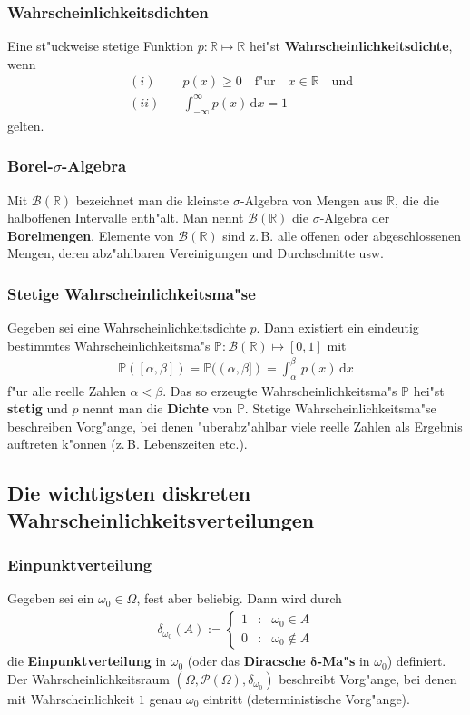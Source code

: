 \documentclass[ngerman,draft,parskip=half,twoside]{scrartcl}
\newcommand*{\R}{\mathbb{R}}      %
\newcommand*{\BorelM}{\mathcal{B}}  %
\newcommand*{\PotM}{\mathcal{P}}    %
\newcommand*{\WKM}{\mathbb{P}}      %
\begin{document}
\subsubsection{Wahrscheinlichkeitsdichten}
Eine st"uckweise stetige Funktion $p\colon\R\mapsto\R$ hei"st
\textbf{Wahrscheinlichkeitsdichte}, wenn
\begin{eqnarray*}
&(i)&\quad p(x)\ge 0\quad\mbox{f"ur}\quad x\in\R\quad \mbox{und}\\
&(ii)&\quad\int_{-\infty}^\infty p(x)\,\mathrm d x=1
\end{eqnarray*}
gelten.
\subsubsection{Borel-$\sigma$-Algebra}
Mit $\BorelM(\R)$ bezeichnet man die kleinste $\sigma$-Algebra von Mengen aus $\R$, die
die halboffenen Intervalle enth"alt. Man nennt $\BorelM(\R)$ die $\sigma$-Algebra der
\textbf{Borelmengen}. Elemente von $\BorelM(\R)$ sind z.\,B. alle offenen oder abgeschlossenen Mengen,
deren abz"ahlbaren Vereinigungen und Durchschnitte usw.
\subsubsection{Stetige Wahrscheinlichkeitsma"se}
Gegeben sei eine Wahrscheinlichkeitsdichte $p$. Dann existiert ein eindeutig bestimmtes
Wahrscheinlichkeitsma"s $\WKM \colon\BorelM(\R)\mapsto [0,1]$ mit
\begin{gather*}
  \WKM([\alpha,\beta])=\WKM((\alpha,\beta])=\int_\alpha^\beta\,p(x)\,\mathrm dx
\end{gather*}
f"ur alle reelle Zahlen $\alpha<\beta$. Das so erzeugte Wahrscheinlichkeitsma"s $\WKM$ hei"st \textbf{stetig}
und $p$ nennt man die \textbf{Dichte} von $\WKM$. Stetige Wahrscheinlichkeitsma"se beschreiben Vorg"ange,
bei denen "uberabz"ahlbar viele reelle Zahlen als Ergebnis auftreten k"onnen (z.\,B. Lebenszeiten etc.).
\subsection{Die wichtigsten diskreten Wahrscheinlichkeitsverteilungen}

\subsubsection{Einpunktverteilung}
Gegeben sei ein $\omega_0\in \Omega$, fest aber beliebig. Dann wird
durch
\begin{gather*}
  \delta_{\omega_0}(A):=\left\{
     \begin{array}{rcl}
       1 &:& \omega_0\in A\\
       0 &:& \omega_0\notin A
     \end{array}
     \right.
\end{gather*}
die \textbf{Einpunktverteilung} in $\omega_0$ (oder das \textbf{Diracsche $\mathbf \delta$-Ma"s} in
$\omega_0$) definiert. Der Wahrscheinlichkeitsraum $(\Omega,\PotM(\Omega),\delta_{\omega_0})$
beschreibt Vorg"ange, bei denen mit Wahrscheinlichkeit $1$ genau $\omega_0$ eintritt (deterministische
Vorg"ange).
\end{document}
